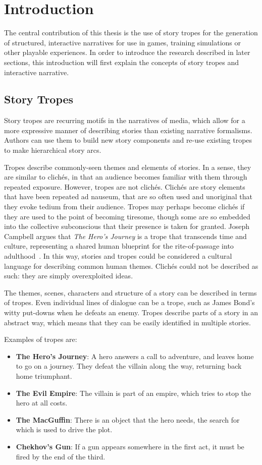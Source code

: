 \chapter{Introduction}
\label{cha:introduction}
The central contribution of this thesis is the use of story tropes for the
generation of structured, interactive narratives for use in games, training
simulations or other playable experiences. In order to introduce the research
described in later sections, this introduction will first explain the concepts of story
tropes and interactive narrative.

\section{Story Tropes}

Story tropes are recurring motifs in the narratives of media, which allow for a more expressive manner of describing stories than existing narrative formalisms. Authors can use them to build new story components and re-use existing tropes to make hierarchical story arcs.

Tropes describe commonly-seen themes and elements of stories. In a sense, they are similar to clich\'es, in that an audience becomes familiar with them through repeated exposure. However, tropes are not clich\'es. Clich\'es are story elements that have been repeated ad nauseum, that are so often used and unoriginal that they evoke tedium from their audience. Tropes may perhaps become clich\'es if they are used to the point of becoming tiresome, though some are so embedded into the collective subconscious that their presence is taken for granted. Joseph Campbell argues that \emph{The Hero's Journey} is a trope that transcends time and culture, representing a shared human blueprint for the rite-of-passage into adulthood~\cite{campbell2008hero}. In this way, stories and tropes could be considered a cultural language for describing common human themes. Clich\'es could not be described as such: they are simply overexploited ideas.

The themes, scenes, characters and structure of a story can be described in terms of tropes. Even individual lines of dialogue can be a trope, such as James Bond's witty put-downs when he defeats an enemy. Tropes describe parts of a story in an abstract way, which means that they can be easily identified in multiple stories.

Examples of tropes are:

\begin{itemize}
\item \textbf{The Hero's Journey}: A hero answers a call to adventure, and leaves home to go on a journey. They defeat the villain along the way, returning back home triumphant.
\item \textbf{The Evil Empire}: The villain is part of an empire, which tries to stop the hero at all costs.
\item \textbf{The MacGuffin}: There is an object that the hero needs, the search for which is used to drive the plot.
\item \textbf{Chekhov's Gun}: If a gun appears somewhere in the first act, it must be fired by the end of the third.
\end{itemize}

